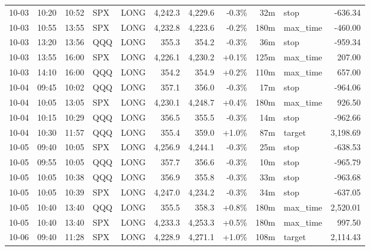 \documentclass[11pt,a4paper,twoside]{article}
\begin{document}
\begin{center}
\begin{longtable}{>{\color{txtmain}}l l l l l r r r r >{\color{txtmain}}l r}
10-03 & 10:20 & 10:52 & SPX & LONG & 4,242.3 & 4,229.6 & \textcolor{lossred}{-0.3\%} & 32m & stop & \textcolor{lossred}{-636.34} \\
10-03 & 10:55 & 13:55 & SPX & LONG & 4,232.8 & 4,223.6 & \textcolor{lossred}{-0.2\%} & 180m & max\_time & \textcolor{lossred}{-460.00} \\
10-03 & 13:20 & 13:56 & QQQ & LONG & 355.3 & 354.2 & \textcolor{lossred}{-0.3\%} & 36m & stop & \textcolor{lossred}{-959.34} \\
10-03 & 13:55 & 16:00 & SPX & LONG & 4,226.1 & 4,230.2 & \textcolor{wingreen}{+0.1\%} & 125m & max\_time & \textcolor{wingreen}{207.00} \\
10-03 & 14:10 & 16:00 & QQQ & LONG & 354.2 & 354.9 & \textcolor{wingreen}{+0.2\%} & 110m & max\_time & \textcolor{wingreen}{657.00} \\
10-04 & 09:45 & 10:02 & QQQ & LONG & 357.1 & 356.0 & \textcolor{lossred}{-0.3\%} & 17m & stop & \textcolor{lossred}{-964.06} \\
10-04 & 10:05 & 13:05 & SPX & LONG & 4,230.1 & 4,248.7 & \textcolor{wingreen}{+0.4\%} & 180m & max\_time & \textcolor{wingreen}{926.50} \\
10-04 & 10:15 & 10:29 & QQQ & LONG & 356.5 & 355.5 & \textcolor{lossred}{-0.3\%} & 14m & stop & \textcolor{lossred}{-962.66} \\
10-04 & 10:30 & 11:57 & QQQ & LONG & 355.4 & 359.0 & \textcolor{wingreen}{+1.0\%} & 87m & target & \textcolor{wingreen}{3,198.69} \\
10-05 & 09:40 & 10:05 & SPX & LONG & 4,256.9 & 4,244.1 & \textcolor{lossred}{-0.3\%} & 25m & stop & \textcolor{lossred}{-638.53} \\
10-05 & 09:55 & 10:05 & QQQ & LONG & 357.7 & 356.6 & \textcolor{lossred}{-0.3\%} & 10m & stop & \textcolor{lossred}{-965.79} \\
10-05 & 10:05 & 10:38 & QQQ & LONG & 356.9 & 355.8 & \textcolor{lossred}{-0.3\%} & 33m & stop & \textcolor{lossred}{-963.68} \\
10-05 & 10:05 & 10:39 & SPX & LONG & 4,247.0 & 4,234.2 & \textcolor{lossred}{-0.3\%} & 34m & stop & \textcolor{lossred}{-637.05} \\
10-05 & 10:40 & 13:40 & QQQ & LONG & 355.5 & 358.3 & \textcolor{wingreen}{+0.8\%} & 180m & max\_time & \textcolor{wingreen}{2,520.01} \\
10-05 & 10:40 & 13:40 & SPX & LONG & 4,233.3 & 4,253.3 & \textcolor{wingreen}{+0.5\%} & 180m & max\_time & \textcolor{wingreen}{997.50} \\
10-06 & 09:40 & 11:28 & SPX & LONG & 4,228.9 & 4,271.1 & \textcolor{wingreen}{+1.0\%} & 108m & target & \textcolor{wingreen}{2,114.43} \\

\end{longtable}
\end{center}
\end{document}

